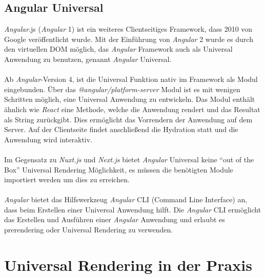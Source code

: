 \documentclass[runningheads]{llncs}
\numberwithin{figure}{section}
\begin{document}
\subsection{Angular Universal}
\label{subsec:Angular Universal}
\textit{Angular}.js (\textit{Angular} 1) ist ein weiteres Clientseitiges Framework, 
dass 2010 von Google veröffentlicht wurde. 
Mit der Einführung von \textit{Angular} 2 wurde es durch den virtuellen DOM möglich, 
das \textit{Angular} Framework auch als Universal Anwendung zu benutzen, 
genannt \textit{Angular} Universal. 
\\
\\
Ab \textit{Angular}-Version 4, 
ist die Universal Funktion nativ im Framework als Modul eingebunden. 
Über das \textit{@angular/platform-server} Modul ist es mit wenigen Schritten möglich, 
eine Universal Anwendung zu entwickeln. 
Das Modul enthält ähnlich wie \textit{React} eine Methode, 
welche die Anwendung rendert und das Resultat als String zurückgibt. 
Dies ermöglicht das Vorrendern der Anwendung auf dem Server. 
Auf der Clientseite findet anschließend die Hydration statt und 
die Anwendung wird interaktiv. 
\\
\\
Im Gegensatz zu \textit{Nuxt.js} und \textit{Next.js} bietet \textit{Angular} Universal keine 
“out of the Box” Universal Rendering Möglichkeit, 
es müssen die benötigten Module importiert werden um dies zu erreichen. 
\\
\\
\textit{Angular} bietet das Hilfswerkzeug \textit{Angular} CLI (Command Line Interface) an, 
dass beim Erstellen einer Universal Anwendung hilft. 
Die \textit{Angular} CLI ermöglicht das Erstellen und Ausführen einer \textit{Angular} Anwendung und 
erlaubt es prerendering oder Universal Rendering zu verwenden. 

\newpage

\section{Universal Rendering in der Praxis}
\label{sec:Universal Rendering in der Praxis}
\end{document}
